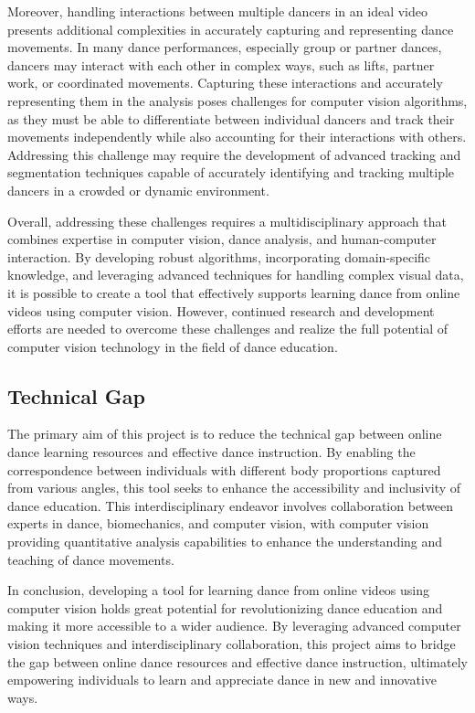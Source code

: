 Moreover, handling interactions between multiple dancers in an ideal video presents additional 
complexities in accurately capturing and representing dance movements. In many dance performances, 
especially group or partner dances, dancers may interact with each other in complex ways, such as 
lifts, partner work, or coordinated movements. Capturing these interactions and accurately 
representing them in the analysis poses challenges for computer vision algorithms, as they must be 
able to differentiate between individual dancers and track their movements independently while also 
accounting for their interactions with others. Addressing this challenge may require the development 
of advanced tracking and segmentation techniques capable of accurately identifying and tracking 
multiple dancers in a crowded or dynamic environment.

Overall, addressing these challenges requires a multidisciplinary approach that combines expertise 
in computer vision, dance analysis, and human-computer interaction. By developing robust algorithms, 
incorporating domain-specific knowledge, and leveraging advanced techniques for handling complex 
visual data, it is possible to create a tool that effectively supports learning dance from online 
videos using computer vision. However, continued research and development efforts are needed to 
overcome these challenges and realize the full potential of computer vision technology in the 
field of dance education.

\subsection{Technical Gap}
The primary aim of this project is to reduce the technical gap between online dance learning resources and 
effective dance instruction. By enabling the correspondence between individuals with different body proportions 
captured from various angles, this tool seeks to enhance the accessibility and inclusivity of dance education. 
This interdisciplinary endeavor involves collaboration between experts in dance, biomechanics, and computer 
vision, with computer vision providing quantitative analysis capabilities to enhance the understanding and 
teaching of dance movements.

In conclusion, developing a tool for learning dance from online videos using computer vision holds 
great potential for revolutionizing dance education and making it more accessible to a wider 
audience. By leveraging advanced computer vision techniques and interdisciplinary collaboration, 
this project aims to bridge the gap between online dance resources and effective dance instruction, 
ultimately empowering individuals to learn and appreciate dance in new and innovative ways.


